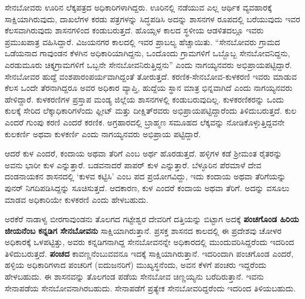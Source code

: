ಸೇನಬೋವರು ಊರಿನ ಲೆಕ್ಕಪತ್ರದ ಅಧಿಕಾರಿಗಳಾಗಿದ್ದರು. ಊರಿನಲ್ಲಿ ನಡೆಯುವ ಎಲ್ಲ ಆರ್ಥಿಕ ವ್ಯವಹಾರಕ್ಕೆ ಸಾಕ್ಷಿಯಾಗಿರುವುದು, ದಾಖಲೆಗಳ ಕರಡು ಪತ್ರಗಳನ್ನು ಸಿದ್ಧಪಡಿಸಿ ಅದನ್ನು ಶಾಸನಗಳ ರೂಪದಲ್ಲಿ ಬರೆಯುವುದು ಇವರ ಕೆಲಸವಾಗಿರುವುದು ಶಾಸನಗಳಿಂದ ಕಂಡುಬರುತ್ತದೆ. ಹೊಯ್ಸಳ ಕಾಲದ ಸ್ಥಳೀಯ ಆಡಳಿತದಲ್ಲೂ ಇವರು ಪ್ರಮುಖಪಾತ್ರ ವಹಿಸಿದ್ದಾರೆ. ವಿಜಯನಗರ ಕಾಲದಲ್ಲಿ ಇವರ ಪ್ರಾಬಲ್ಯ ಹೆಚ್ಚಾಯಿತು. “ಸೇನಬೋವರು ಗ್ರಾಮದ ಒಡೆಯನಾದ ಗಾವುಂಡನ ಕೆಳಗಿನ ಅಧಿಕಾರಿಯಾಗಿದ್ದನು, ಒಂದೊಂದು ಗ್ರಾಮಗಳಿಗೆ ಒಬ್ಬೊಬ್ಬ ಸೇನಬೋವನಿದ್ದನು, ಎರಡುಮೂರು ಚಿಕ್ಕಗ್ರಾಮಗಳಿಗೆ ಒಬ್ಬನೇ ಸೇನಬೋವನಿರುತ್ತಿದ್ದನು” ಎಂದು ನಾಗಯ್ಯನವರು ಅಭಿಪ್ರಾಯಪಟ್ಟಿದ್ದಾರೆ. ಸೇನಬೋವರ ಹುದ್ದೆ ವಂಶಪಾರಂಪರ್ಯವಾಗಿದ್ದಂತೆ ತೋರುತ್ತದೆ. ಕರಣಿಕ-ಸೇನಬೋವ-ಕುಳಕರಣಿ ಇವರು ಮಾಡುವ ಕೆಲಸ ಒಂದೇ ತೆರನಾಗಿದ್ದರೂ ಅವರ ಅಧಿಕಾರ ವ್ಯಾಪ್ತಿ, ಹುದ್ದೆಯ ಸ್ಥಾನ ಮಾತ್ರ ಭಿನ್ನವಾಗಿದೆ ಎಂದು ನಾಗಯ್ಯನವರು ಹೇಳಿದ್ದಾರೆ. ಕುಳಕರಣಿಗಳ ಪ್ರಸ್ತಾಪ ಮಂಡ್ಯ ಜಿಲ್ಲೆಯ ಶಾಸನಗಳಲ್ಲಿ ಕಂಡುಬರುವುದಿಲ್ಲ. ಕುಳಕರಣಿಕರನ್ನು ಒಂದು ಕುಲಕ್ಕೆ ಸೇರಿದ ಲೆಕ್ಕಾಧಿಕಾರಿಗಳೆಂದು ಫ್ಲೀಟ್​ ಮತ್ತು ದೀಕ್ಷಿತ್​ರವರು ಅಭಿಪ್ರಾಯಪಟ್ಟಿದ್ದಾರೆಂದು ತಿಳಿದುಬರುತ್ತದೆ. ಕುಲ ಎಂದರೆ ಗುಂಪು ಕರಣಿ ಎಂದರೆ ಕರಣಿಕ. ಅಗ್ರಹಾರದಲ್ಲಿ ಬ್ರಾಹ್ಮಣ ಸಮೂಹದ ಲೆಕ್ಕವನ್ನು ನೋಡಿಕೊಳ್ಳುತ್ತಿದ್ದವನೇ ಕುಲಕರ್ಣಿ ಅಥವಾ ಕುಳಕರ್ಣಿ ಎಂದು ನಾಗಯ್ಯನವರು ಅಭಿಪ್ರಾಯ ಪಟ್ಟಿದ್ದಾರೆ.

\vskip 2pt

ಆದರೆ ಕುಳ ಎಂದರೆ, ಕಂದಾಯ ಅಥವಾ ತೆರಿಗೆ ಎಂಬ ಅರ್ಥ ಹೊರಡುತ್ತದೆ. ಹಳ್ಳಿಗಳ ಕಡೆ ಶ‍್ರೀಮಂತ ರೈತರನ್ನು ಅವನು ಭಾರೀ ಕುಳ ಎನ್ನುತ್ತಾರೆ. ಬಡವನಾದರೆ ಪಾಪರ್​ ಕುಳ ಎನ್ನುತ್ತಾರೆ. ಬೆಳ್ಳೂರಿನ ಪೆರಮಾಳೆ ದೇವ ದಂಡನಾಯಕನ ಶಾಸನದಲ್ಲಿ ‘ಕುಳವ ಕಟ್ಟಿಸಿ’ ಎಂಬ ಪದ ಪ್ರಯೋಗವಿದ್ದು, ಇದು ಕಂದಾಯ ಅಥವಾ ತೆರಿಗೆಯನ್ನು ಪುನರ್​ ನಿಗದಿಪಡಿಸಿದ್ದನ್ನು ಸೂಚಿಸುತ್ತದೆ. ಆದಕಾರಣ, ಕುಳ ಎಂದರೆ ಕಂದಾಯ ಅಥವಾ ತೆರಿಗೆ. ಅದನ್ನು ವಸೂಲು ಮಾಡವ ಅಧಿಕಾರಿಯೇ ಕುಳಕರಣಿ ಎಂದು ಹೇಳಬಹುದು.

ಅರಕೆರೆ ನಾಡಾಳ್ವ ಬೀರಗಾವುಂಡನು ತೊಲಗದ ಗಟ್ಟೇಶ್ವರ ದೇವರಿಗೆ ದತ್ತಿಯನ್ನು ಬಿಟ್ಟಾಗ ಅದಕ್ಕೆ \textbf{ಪಂಚಗೊಂಡ ಹಿರಿಯ ಜೀಯನೆಂಬ} \textbf{ಕನ್ನಡಿಗ ಸೇನಬೋವನು} ಸಾಕ್ಷಿಯಾಗಿರುತ್ತಾನೆ. ಪ್ರಸಕ್ತ ಶಾಸನದ ಕಾಲದಲ್ಲಿ ಈ ಪ್ರದೇಶವು ಚೋಳರ ಅಧಿಕಾರಕ್ಕೆ ಒಳಪಟ್ಟಿತ್ತು, ಅವರು ಕನ್ನಡಿಗನಾಗಿದ್ದ ಸೇನಬೋವನನ್ನೇ ಅಧಿಕಾರದಲ್ಲಿ ಮುಂದುವರಿಸಿದ್ದರೆಂದು ಇದರಿಂದ ತಿಳಿದುಬರುತ್ತದೆ. \textbf{ಪಂಚದ} ಕಾವಣ್ಣನೆಂಬುವವನೂ ಇದಕ್ಕೆ ಸಾಕ್ಷಿಯಾಗಿರುತ್ತಾನೆ. ಇದರಿಂದಾಗಿ ಪಂಚಗೊಂಡ ಎಂದರೆ, ಹಳ್ಳಿಯ ಅಧಿಕಾರಿಗಳಾದ ಪಂಚರಿಗೆ (ಐದುಜನರಿಗೆ) ಮುಖ್ಯಸ್ಥನೆಂದು, ಅವನ ಕೆಳಗೆ ಪಂಚರು ಇದ್ದರೆಂದು ಹೇಳಬಹುದು. ಈ ಶಾಸನವನ್ನು ತೊಲಗಂಡ ಪಡೆಯ ಸೇನಬೋವ ಚಿಣ್ಣಯ್ಯನು ಬರೆದಿರುತ್ತಾನೆ. ಇವನು ಸೇನಾಪಡೆಯ ಸೇನಬೋವನಾಗಿರಬಹುದು. ಸೇನಾಪಡೆಗೆ ಪ್ರತ್ಯೇಕ ಸೇನಬೋವರಿದ್ದರೆಂದು ಇದರಿಂದ ತಿಳಿಯಬಹುದು.

